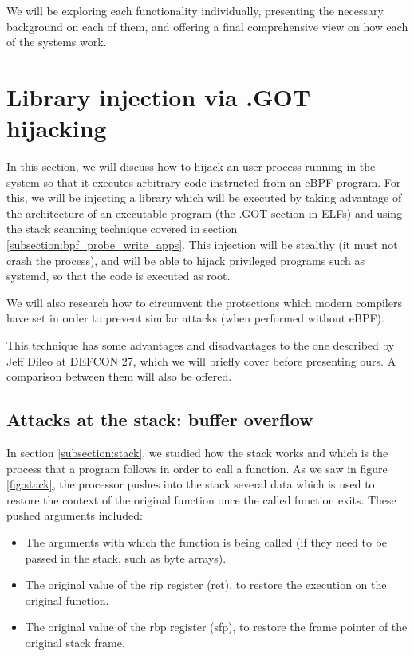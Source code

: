 \documentclass[12pt]{report} %
\begin{document}
We will be exploring each functionality individually, presenting the necessary background on each of them, and offering a final comprehensive view on how each of the systems work.

\section{Library injection via .GOT hijacking}
In this section, we will discuss how to hijack an user process running in the system so that it executes arbitrary code instructed from an eBPF program. For this, we will be injecting a library which will be executed by taking advantage of the architecture of an executable program (the .GOT section in ELFs) and using the stack scanning technique covered in section \ref{subsection:bpf_probe_write_apps}. This injection will be stealthy (it must not crash the process), and will be able to hijack privileged programs such as systemd, so that the code is executed as root.

We will also research how to circumvent the protections which modern compilers have set in order to prevent similar attacks (when performed without eBPF).

This technique has some advantages and disadvantages to the one described by Jeff Dileo at DEFCON 27\cite{evil_ebpf_p6974}, which we will briefly cover before presenting ours. A comparison between them will also be offered.

\subsection{Attacks at the stack: buffer overflow}
In section \ref{subsection:stack}, we studied how the stack works and which is the process that a program follows in order to call a function. As we saw in figure \ref{fig:stack}, the processor pushes into the stack several data which is used to restore the context of the original function once the called function exits. These pushed arguments included:
\begin{itemize}
\item The arguments with which the function is being called (if they need to be passed in the stack, such as byte arrays).
\item The original value of the rip register (ret), to restore the execution on the original function.
\item The original value of the rbp register (sfp), to restore the frame pointer of the original stack frame.
\end{itemize}
\end{document}
